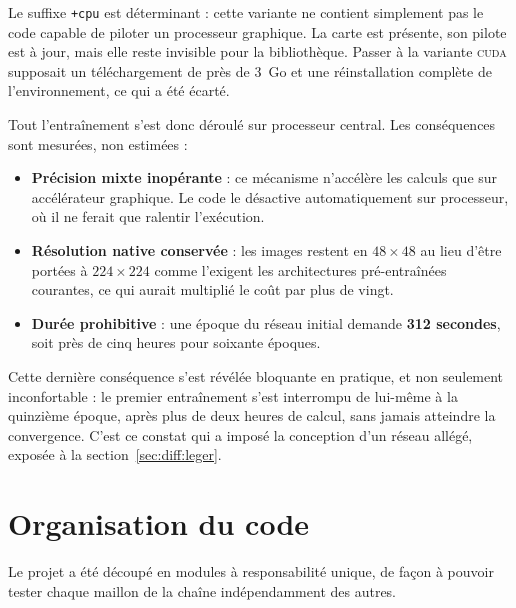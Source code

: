 \documentclass[a4paper,12pt]{report}
\begin{document}
Le suffixe \texttt{+cpu} est déterminant : cette variante ne contient
simplement pas le code capable de piloter un processeur graphique. La carte est
présente, son pilote est à jour, mais elle reste invisible pour la bibliothèque.
Passer à la variante \textsc{cuda} supposait un téléchargement de près de 3~Go
et une réinstallation complète de l'environnement, ce qui a été écarté.

Tout l'entraînement s'est donc déroulé sur processeur central. Les conséquences
sont mesurées, non estimées :

\begin{itemize}[leftmargin=*,itemsep=3pt]
  \item \textbf{Précision mixte inopérante} : ce mécanisme n'accélère les
        calculs que sur accélérateur graphique. Le code le désactive
        automatiquement sur processeur, où il ne ferait que ralentir
        l'exécution.
  \item \textbf{Résolution native conservée} : les images restent en
        $48\times48$ au lieu d'être portées à $224\times224$ comme l'exigent
        les architectures pré-entraînées courantes, ce qui aurait multiplié le
        coût par plus de vingt.
  \item \textbf{Durée prohibitive} : une époque du réseau initial demande
        \textbf{312 secondes}, soit près de cinq heures pour soixante époques.
\end{itemize}

Cette dernière conséquence s'est révélée bloquante en pratique, et non
seulement inconfortable : le premier entraînement s'est interrompu de lui-même
à la quinzième époque, après plus de deux heures de calcul, sans jamais
atteindre la convergence. C'est ce constat qui a imposé la conception d'un
réseau allégé, exposée à la section~\ref{sec:diff:leger}.

\section{Organisation du code}

Le projet a été découpé en modules à responsabilité unique, de façon à pouvoir
tester chaque maillon de la chaîne indépendamment des autres.
\end{document}

